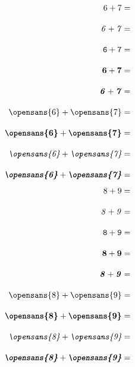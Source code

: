 \documentclass[letterpaper,12pt]{article}
\begin{document}
\begin{multicols}{5}
\begin{align*}
\end{align*}
\begin{align*}
    \mathrm{6+7}&=\\[1em]
    \mathit{6+7}&=\\[1em]
    \mathtt{6+7}&=\\[1em]
    \mathbf{6+7}&=\\[1em]
    \textbf{\textit{6}}+\textbf{\textit{7}}&=\\[1em]
    \textrm{\opensans{6}}+\textrm{\opensans{7}}&=\\[1em]
    \textbf{\opensans{6}}+\textbf{\opensans{7}}&=\\[1em]
    \textit{\opensans{6}}+\textit{\opensans{7}}&=\\[1em]
    \textbf{\textit{\opensans{6}}}+\textbf{\textit{\opensans{7}}}&=\\
\end{align*}
\begin{align*}
    \mathrm{8+9}&=\\[1em]
    \mathit{8+9}&=\\[1em]
    \mathtt{8+9}&=\\[1em]
    \mathbf{8+9}&=\\[1em]
    \textbf{\textit{8}}+\textbf{\textit{9}}&=\\[1em]
    \textrm{\opensans{8}}+\textrm{\opensans{9}}&=\\[1em]
    \textbf{\opensans{8}}+\textbf{\opensans{9}}&=\\[1em]
    \textit{\opensans{8}}+\textit{\opensans{9}}&=\\[1em]
    \textbf{\textit{\opensans{8}}}+\textbf{\textit{\opensans{9}}}&=\\[1em]
\end{align*}

\end{multicols}
\end{document}
